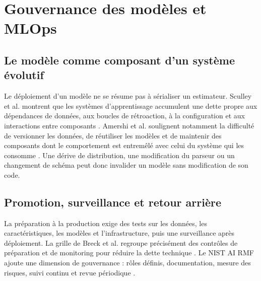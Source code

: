 
\section{Gouvernance des modèles et MLOps}

\subsection{Le modèle comme composant d'un système évolutif}

Le déploiement d'un modèle ne se résume pas à sérialiser un estimateur. Sculley et al.
montrent que les systèmes d'apprentissage accumulent une dette propre aux dépendances de
données, aux boucles de rétroaction, à la configuration et aux interactions entre
composants \cite{sculley2015debt}. Amershi et al. soulignent notamment la difficulté de
versionner les données, de réutiliser les modèles et de maintenir des composants dont le
comportement est entremêlé avec celui du système qui les consomme
\cite{amershi2019software}. Une dérive de distribution, une modification du parseur ou un
changement de schéma peut donc invalider un modèle sans modification de son code.

\subsection{Promotion, surveillance et retour arrière}

La préparation à la production exige des tests sur les données, les caractéristiques,
les modèles et l'infrastructure, puis une surveillance après déploiement. La grille de
Breck et al. regroupe précisément des contrôles de préparation et de monitoring pour
réduire la dette technique \cite{breck2017mltest}. Le NIST AI RMF ajoute une dimension de
gouvernance : rôles définis, documentation, mesure des risques, suivi continu et revue
périodique \cite{nist2023airmf}.

